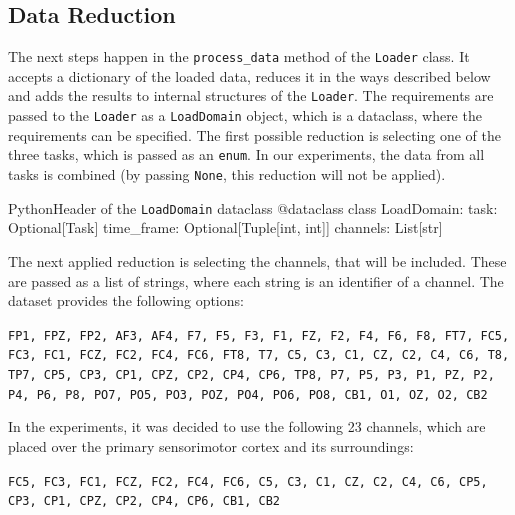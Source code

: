 \documentclass[english, he, bc, kiv, iso690alph, viewonly]{fasthesis}
\begin{document}
\subsection{Data Reduction}

The next steps happen in the \texttt{process\_data} method of the \texttt{Loader} class. It accepts a dictionary of the loaded data, reduces it in the ways described below and adds the results to internal structures of the \texttt{Loader}. The requirements are passed to the \texttt{Loader} as a \texttt{LoadDomain} object, which is a dataclass, where the requirements can be specified. The first possible reduction is selecting one of the three tasks, which is passed as an \texttt{enum}. In our experiments, the data from all tasks is combined (by passing \texttt{None}, this reduction will not be applied).

\begin{code}{Python}{Header of the \texttt{LoadDomain} dataclass}
	@dataclass
	class LoadDomain:
	task: Optional[Task]
	time_frame: Optional[Tuple[int, int]]
	channels: List[str]
\end{code}

The next applied reduction is selecting the channels, that will be included. These are passed as a list of strings, where each string is an identifier of a channel. The dataset provides the following options:

\texttt{FP1, FPZ, FP2, AF3, AF4, F7, F5, F3, F1, FZ, F2, F4, F6, F8, FT7, FC5, FC3, FC1, FCZ, FC2, FC4, FC6, FT8, T7, C5, C3, C1, CZ, C2, C4, C6, T8, TP7, CP5, CP3, CP1, CPZ, CP2, CP4, CP6, TP8, P7, P5, P3, P1, PZ, P2, P4, P6, P8, PO7, PO5, PO3, POZ, PO4, PO6, PO8, CB1, O1, OZ, O2, CB2}

In the experiments, it was decided to use the following 23 channels, which are placed over the primary sensorimotor cortex and its surroundings:

\texttt{FC5, FC3, FC1, FCZ, FC2, FC4, FC6, C5, C3, C1, CZ, C2, C4, C6, CP5, CP3, CP1, CPZ, CP2, CP4, CP6, CB1, CB2}
\end{document}
